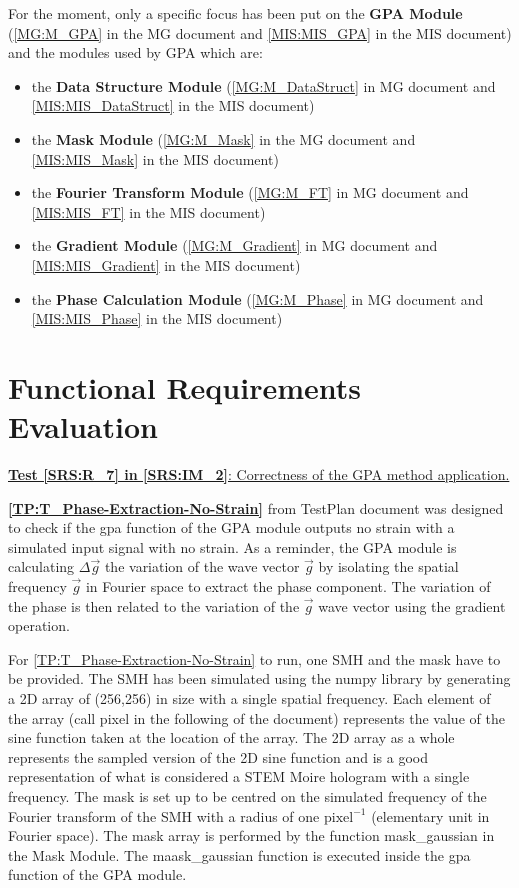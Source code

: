 \documentclass[12pt, titlepage]{article}
\begin{document}
For the moment, only a specific focus has been put on the \textbf{GPA Module} (\cref{MG:M_GPA} in the  MG document and \cref{MIS:MIS_GPA} in the MIS document) and the modules used by GPA which are:
\begin{itemize}
\item the \textbf{Data Structure Module} (\cref{MG:M_DataStruct} in MG document and \cref{MIS:MIS_DataStruct} in the MIS document)
\item the \textbf{Mask Module} (\cref{MG:M_Mask} in the MG document and \cref{MIS:MIS_Mask} in the MIS document)
\item the \textbf{Fourier Transform Module} (\cref{MG:M_FT} in MG document and \cref{MIS:MIS_FT} in the MIS document)
\item the \textbf{Gradient Module} (\cref{MG:M_Gradient} in MG document and \cref{MIS:MIS_Gradient} in the MIS document)
\item the \textbf{Phase Calculation Module} (\cref{MG:M_Phase} in MG document and \cref{MIS:MIS_Phase} in the MIS document)
\end{itemize}

\section{Functional Requirements Evaluation}

\underline{\textbf{Test \cref{SRS:R_7} in \cref{SRS:IM_2}}: Correctness of the GPA method application.}\bigskip

\textbf{\cref{TP:T_Phase-Extraction-No-Strain}} from TestPlan document was designed to check if the gpa function of the GPA module outputs no strain with a simulated input signal with no strain. As a reminder, the GPA module is calculating $\Delta \overrightarrow{g}$ the variation of the wave vector $\overrightarrow{g}$ by isolating the spatial frequency $\overrightarrow{g}$ in Fourier space to extract the phase component. The variation of the phase is then related to the variation of the $\overrightarrow{g}$ wave vector using the gradient operation. \medskip

For \cref{TP:T_Phase-Extraction-No-Strain} to run, one SMH and the mask have to be provided. The SMH has been simulated using the numpy library by generating a 2D array of (256,256) in size with a single spatial frequency. Each element of the array (call pixel in the following of the document) represents the value of the sine function taken at the location of the array. The 2D array as a whole represents the sampled version of the 2D sine function and is a good representation of what is considered a STEM Moire hologram with a single frequency. The mask is set up to be centred on the simulated frequency of the Fourier transform of the SMH with a radius of one $\text{pixel}^{-1}$ (elementary unit in Fourier space). The mask array is performed by the function mask{\_}gaussian in the Mask Module. The maask{\_}gaussian function is executed inside the gpa function of the GPA module. \medskip
\end{document}
